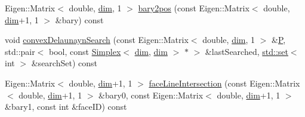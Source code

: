 \begin{DoxyCompactItemize}
\item 
Eigen\+::\+Matrix$<$ double, \hyperlink{plot_nd_a_8m_a382f3ca768b275b8d563604f7fc7df73}{dim}, 1 $>$ \hyperlink{classmodel_1_1_simplex_3_01dim_00_01dim_01_4_a6cc8385077a85f6349214b1e3ac64b02}{bary2pos} (const Eigen\+::\+Matrix$<$ double, \hyperlink{plot_nd_a_8m_a382f3ca768b275b8d563604f7fc7df73}{dim}+1, 1 $>$ \&bary) const 
\item 
void \hyperlink{classmodel_1_1_simplex_3_01dim_00_01dim_01_4_a423162318e2713934a779ed1e55c1fbd}{convex\+Delaunayn\+Search} (const Eigen\+::\+Matrix$<$ double, \hyperlink{plot_nd_a_8m_a382f3ca768b275b8d563604f7fc7df73}{dim}, 1 $>$ \&\hyperlink{_f_e_m_2linear__elasticity__3d_2tetgen_2generate_p_o_l_ycube_8m_a50a9afb44201a65ab7ad5feb2150aeb6}{P}, std\+::pair$<$ bool, const \hyperlink{classmodel_1_1_simplex}{Simplex}$<$ \hyperlink{plot_nd_a_8m_a382f3ca768b275b8d563604f7fc7df73}{dim}, \hyperlink{plot_nd_a_8m_a382f3ca768b275b8d563604f7fc7df73}{dim} $>$ $\ast$ $>$ \&last\+Searched, \hyperlink{plot_cells_8m_a03623d69001c34fc77654be29bdc3d8a}{std\+::set}$<$ int $>$ \&search\+Set) const 
\item 
Eigen\+::\+Matrix$<$ double, \hyperlink{plot_nd_a_8m_a382f3ca768b275b8d563604f7fc7df73}{dim}+1, 1 $>$ \hyperlink{classmodel_1_1_simplex_3_01dim_00_01dim_01_4_a17f89209afe58a98c02c871caeafb5fe}{face\+Line\+Intersection} (const Eigen\+::\+Matrix$<$ double, \hyperlink{plot_nd_a_8m_a382f3ca768b275b8d563604f7fc7df73}{dim}+1, 1 $>$ \&bary0, const Eigen\+::\+Matrix$<$ double, \hyperlink{plot_nd_a_8m_a382f3ca768b275b8d563604f7fc7df73}{dim}+1, 1 $>$ \&bary1, const int \&face\+I\+D) const 
\end{DoxyCompactItemize}
